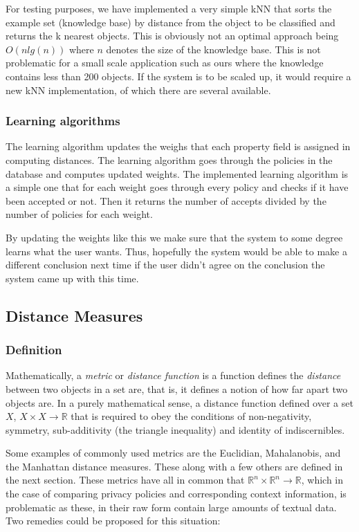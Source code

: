 For testing purposes, we have implemented a very simple kNN that sorts the example set (knowledge base) by distance from the object to be classified and returns the k nearest objects. This is obviously not an optimal approach being $O(n lg(n))$ where $n$ denotes the size of the knowledge base. This is not problematic for a small scale application such as ours where the knowledge contains less than 200 objects. If the system is to be scaled up, it would require a new kNN implementation, of which there are several available.

\subsubsection{Learning algorithms}\label{learnAlgos}
The learning algorithm updates the weighs that each property field is assigned in computing distances. The learning algorithm goes through the policies in the database and computes updated weights. The implemented learning algorithm is a simple one that for each weight goes through every policy and checks if it have been accepted or not. Then it returns the number of accepts divided by the number of policies for each weight.

By updating the weights like this we make sure that the system to some degree learns what the user wants. Thus, hopefully the system would be able to make a different conclusion next time if the user didn't agree on the conclusion the system came up with this time.

\subsection{Distance Measures}\label{SimilarityMeasures}

\subsubsection{Definition}

Mathematically, a \emph{metric} or \emph{distance function} is a function defines the \emph{distance} between two objects in a set are, that is, it defines a notion of how far apart two objects are. In a purely mathematical sense, a distance function defined over a set $X$, $X\times X\longrightarrow \mathbb{R}$ that is required to obey the conditions of non-negativity, symmetry, sub-additivity (the triangle inequality) and identity of indiscernibles. 

Some examples of commonly used metrics are the Euclidian, Mahalanobis, and the Manhattan distance measures. These along with a few others are defined in the next section. These metrics have all in common that $\mathbb{R}^n\times \mathbb{R}^n\longrightarrow \mathbb{R}$, which in the case of comparing privacy policies and corresponding context information, is problematic as these, in their raw form contain large amounts of textual data. Two remedies could be proposed for this situation:

